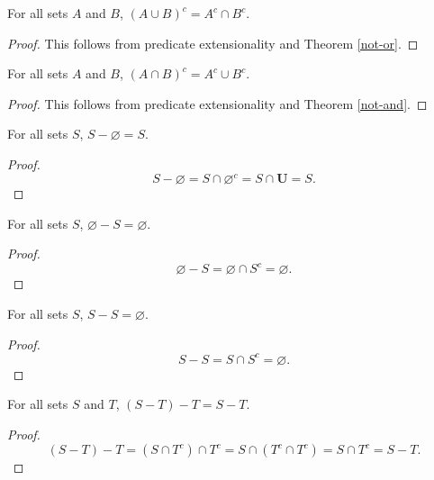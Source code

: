 \documentclass[../math.tex]{subfiles}
\begin{document}
\begin{theorem} \label{union-compl}
    For all sets $A$ and $B$, $(A \cup B)^c = A^c \cap B^c$.
\end{theorem}
\begin{proof}
    This follows from predicate extensionality and Theorem \ref{not-or}.
\end{proof}

\begin{theorem} \label{inter-compl}
    For all sets $A$ and $B$, $(A \cap B)^c = A^c \cup B^c$.
\end{theorem}
\begin{proof}
    This follows from predicate extensionality and Theorem \ref{not-and}.
\end{proof}

\begin{theorem}
    For all sets $S$, $S - \varnothing = S$.
\end{theorem}
\begin{proof}
    \[
        S - \varnothing = S \cap \varnothing^c = S \cap \bm U = S.
    \]
\end{proof}

\begin{theorem}
    For all sets $S$, $\varnothing - S = \varnothing$.
\end{theorem}
\begin{proof}
    \[
        \varnothing - S = \varnothing \cap S^c = \varnothing.
    \]
\end{proof}

\begin{theorem}
    For all sets $S$, $S - S = \varnothing$.
\end{theorem}
\begin{proof}
    \[
        S - S = S \cap S^c = \varnothing.
    \]
\end{proof}

\begin{theorem}
    For all sets $S$ and $T$, $(S - T) - T = S - T$.
\end{theorem}
\begin{proof}
    \[
        (S - T) - T = (S \cap T^c) \cap T^c = S \cap (T^c \cap T^c) = S \cap T^c
        = S - T.
    \]
\end{proof}
\end{document}

